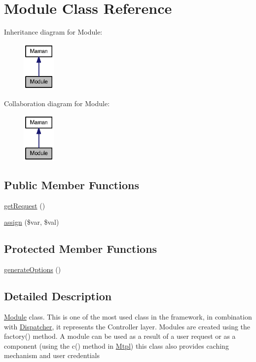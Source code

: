 \hypertarget{classModule}{
\section{Module Class Reference}
\label{classModule}
}
Inheritance diagram for Module:\nopagebreak
\begin{figure}[H]
\begin{center}
\leavevmode
\includegraphics[width=46pt]{classModule__inherit__graph}
\end{center}
\end{figure}
Collaboration diagram for Module:\nopagebreak
\begin{figure}[H]
\begin{center}
\leavevmode
\includegraphics[width=46pt]{classModule__coll__graph}
\end{center}
\end{figure}
\subsection*{Public Member Functions}
\begin{CompactItemize}
\item 
\hyperlink{classModule_b49e9e05ec35dcb3182fb9941f0af9f8}{getRequest} ()
\item 
\hyperlink{classModule_89f3dd2fa37e8da929b595d22dadf05d}{assign} (\$var, \$val)
\end{CompactItemize}
\subsection*{Protected Member Functions}
\begin{CompactItemize}
\item 
\hyperlink{classModule_fdadc52d1e8bf2ec2e5aa1eb679ddd9a}{generateOptions} ()
\end{CompactItemize}


\subsection{Detailed Description}
\hyperlink{classModule}{Module} class. This is one of the most used class in the framework, in combination with \hyperlink{classDispatcher}{Dispatcher}, it represents the Controller layer. Modules are created using the factory() method. A module can be used as a result of a user request or as a component (using the c() method in \hyperlink{classMtpl}{Mtpl}) this class also provides caching mechanism and user credentials 

